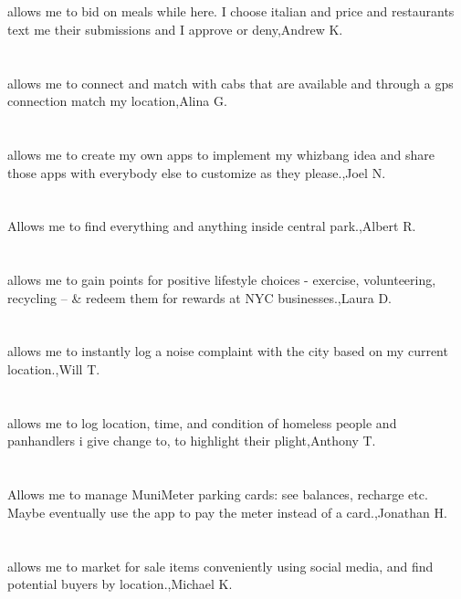 \section{}allows me to bid on meals while here.  I choose italian and price and restaurants text me their submissions and I approve or deny,Andrew K.	
\section{}allows me to connect and match with cabs that are available and through a gps connection match my location,Alina G.	
\section{}allows me to create my own apps to implement my whizbang idea and share those apps with everybody else to customize as they please.,Joel N.	
\section{} Allows me to find everything and anything inside central park.,Albert R.	
\section{}allows me to gain points for positive lifestyle choices - exercise, volunteering, recycling --  \& redeem them for rewards at NYC businesses.,Laura D.	
\section{}allows me to instantly log a noise complaint with the city based on my current location.,Will T.	
\section{} allows me to log location, time, and condition of homeless people and panhandlers i give change to, to highlight their plight,Anthony T.	
\section{}Allows me to manage MuniMeter parking cards: see balances, recharge etc. Maybe eventually use the app to pay the meter instead of a card.,Jonathan H.	
\section{}allows me to market for sale items conveniently using social media, and find potential buyers by location.,Michael K.	
